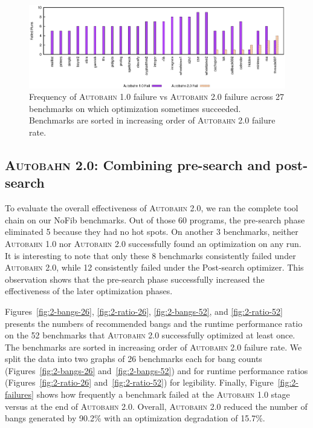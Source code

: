 \documentclass[format=sigplan, review=true, 9pt]{acmart}
\newcommand{\figref}[1]{Figure~\ref{#1}}
\newcommand{\scaption}[1]{\caption{#1}}
\newcommand{\hotspots}[0]{hot spots}
\newcommand{\Ao}[0]{\textsc{Autobahn 1.0}}
\newcommand{\At}[0]{\textsc{Autobahn 2.0}}
\newcommand{\preopt}[0]{pre-search}
\newcommand{\postopt}[0]{post-search}
\newcommand{\Postopt}[0]{Post-search}
\begin{document}
\begin{figure}
\includegraphics[width=\textwidth]{aut-post-fail}
\scaption{Frequency of \Ao{} failure vs \At{} failure across 27
benchmarks on which optimization sometimes succeeded. Benchmarks are sorted in
increasing order of \At{} failure rate. } 
\label{fig:post-failures}
\end{figure}

\subsection{\At{}: Combining \preopt{} and \postopt{}}

To evaluate the overall effectiveness of \At{}, we ran the complete
tool chain on our NoFib benchmarks. Out of those 60
programs, the \preopt{} phase eliminated 5 because they had
no \hotspots{}.  On another 3 benchmarks, neither \Ao{} nor \At{} 
successfully found an optimization on any run. 
It is interesting to note that only these 8
benchmarks consistently failed under \At{}, while 12
consistently failed under the \Postopt{} optimizer. 
This observation shows that the \preopt{} phase successfully
increased the effectiveness of the later optimization phases. 

Figures~\ref{fig:2-bangs-26}, \ref{fig:2-ratio-26}, \ref{fig:2-bangs-52},
and \ref{fig:2-ratio-52} presents the numbers of recommended bangs and
the runtime performance ratio on the 52 benchmarks that \At{} 
successfully optimized at least once.
The benchmarks are sorted in increasing order of \At{} failure rate.
We split the data into two graphs of 26 benchmarks each for bang counts
(Figures~\ref{fig:2-bangs-26} and~\ref{fig:2-bangs-52})
and for runtime performance ratios
(Figures~\ref{fig:2-ratio-26} and~\ref{fig:2-ratio-52})
for legibility. 
Finally, \figref{fig:2-failures} shows how frequently a benchmark
failed at the \Ao{} stage versus at the end of \At{}. Overall, \At{}
reduced the number of bangs generated by 90.2\%
with an optimization degradation of 15.7\%.
\end{document}
